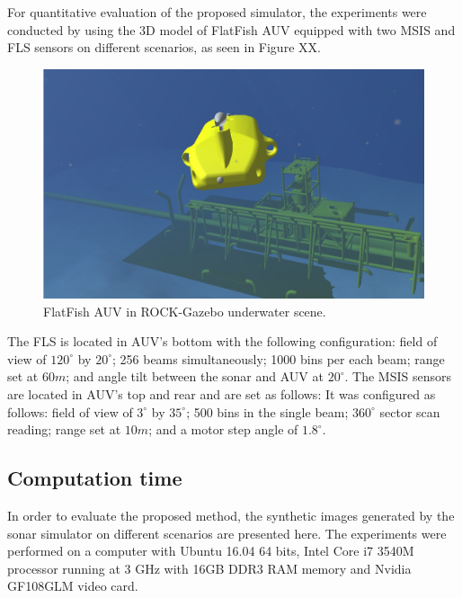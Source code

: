 \documentclass[final,5p,times]{elsarticle}
\begin{document}
For quantitative evaluation of the proposed simulator, the experiments were conducted by using the 3D model of FlatFish AUV equipped with two MSIS and FLS sensors on different scenarios, as seen in Figure XX.

\begin{figure}[!h]
    \includegraphics[width=\columnwidth]{figs/uwscene1}
    \centering
    \captionsetup{justification=centering}
    \caption{FlatFish AUV in ROCK-Gazebo underwater scene.}
    \label{fig:uwscene1}
\end{figure}

The FLS is located in AUV's bottom with the following configuration: field of view of $120^{\circ}$ by $20^{\circ}$; 256 beams simultaneously; 1000 bins per each beam; range set at $60m$; and angle tilt between the sonar and AUV at $20^{\circ}$. The MSIS sensors are located in AUV's top and rear and are set as follows: It was configured as follows: field of view of $3^{\circ}$ by $35^{\circ}$; 500 bins in the single beam; $360^{\circ}$ sector scan reading; range set at $10m$; and a motor step angle of $1.8^{\circ}$.

\subsection{Computation time}

In order to evaluate the proposed method, the synthetic images generated by the sonar simulator on different scenarios are presented here. The experiments were performed on a computer with Ubuntu 16.04 64 bits, Intel Core i7 3540M processor running at 3 GHz with 16GB DDR3 RAM memory and Nvidia GF108GLM video card.
\end{document}
